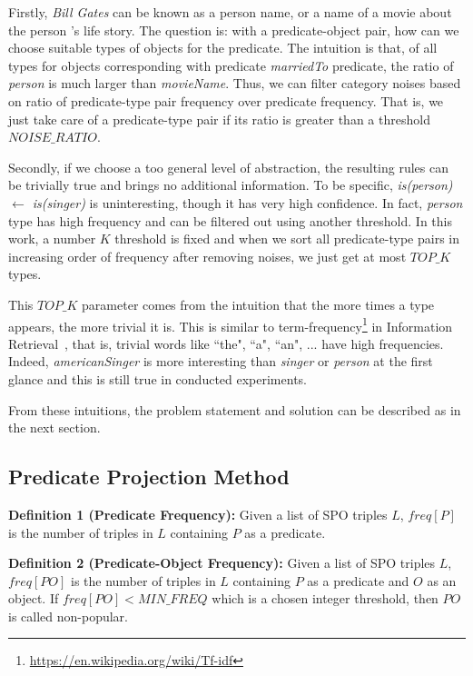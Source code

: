 \documentclass{acm_proc_article-sp}
\begin{document}
Firstly, \textit{Bill Gates} can be known as a person name, or a name of a movie about the person 's life story. The question is: with a predicate-object pair, how can we choose suitable types of objects for the predicate. The intuition is that, of all types for objects corresponding with predicate \textit{marriedTo} predicate, the ratio of \textit{person} is much larger than \textit{movieName}. Thus, we can filter category noises based on ratio of predicate-type pair frequency over predicate frequency. That is, we just take care of a predicate-type pair if its ratio is greater than a threshold $NOISE\_RATIO$.

Secondly, if we choose a too general level of abstraction, the resulting rules can be trivially true and brings no additional information. To be specific, \textit{is(person) $\leftarrow$ is(singer)} is uninteresting, though it has very high confidence. In fact, \textit{person} type has high frequency and can be filtered out using another threshold. In this work, a number $K$ threshold is fixed and when we sort all predicate-type pairs in increasing order of frequency after removing noises, we just get at most $TOP\_K$ types.

This $TOP\_K$ parameter comes from the intuition that the more times a type appears, the more trivial it is. This is similar to term-frequency\footnote{\url{https://en.wikipedia.org/wiki/Tf-idf}} in Information Retrieval~\cite{ref2}, that is, trivial words like ``the", ``a", ``an", ... have high frequencies. Indeed, \textit{americanSinger} is more interesting than \textit{singer} or \textit{person} at the first glance and this is still true in conducted experiments.

From these intuitions, the problem statement and solution can be described as in the next section.

\subsection{Predicate Projection Method\\}

\textbf{Definition 1 (Predicate Frequency):} Given a list of SPO triples $L$, $freq[P]$ is the number of triples in $L$ containing $P$ as a predicate.

\textbf{Definition 2 (Predicate-Object Frequency):} Given a list of SPO triples $L$, $freq[PO]$ is the number of triples in $L$ containing $P$ as a predicate and $O$ as an object. If $freq[PO] < MIN\_FREQ$ which is a chosen integer threshold, then $PO$ is called non-popular.
\end{document}
